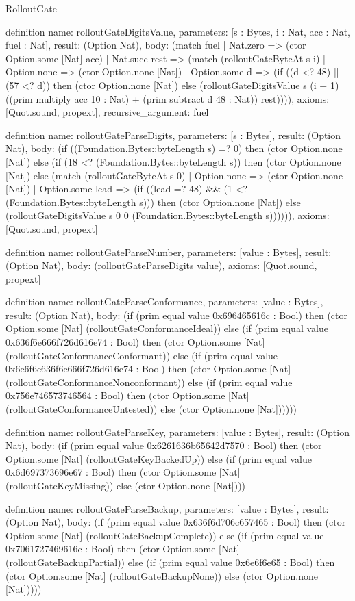 \begin{lexlean}{RolloutGate}
\begin{semanticmodule}
definition{
  name: rolloutGateDigitsValue,
  parameters: [s : Bytes, i : Nat, acc : Nat, fuel : Nat],
  result: (Option Nat),
  body: (match fuel
    | Nat.zero => (ctor Option.some [Nat] acc)
    | Nat.succ rest => (match (rolloutGateByteAt s i)
      | Option.none => (ctor Option.none [Nat])
      | Option.some d => (if ((d <? 48) || (57 <? d)) then (ctor Option.none [Nat]) else (rolloutGateDigitsValue s (i + 1) ((prim multiply acc 10 : Nat) + (prim subtract d 48 : Nat)) rest)))),
  axioms: [Quot.sound, propext],
  recursive_argument: fuel
}

definition{
  name: rolloutGateParseDigits,
  parameters: [s : Bytes],
  result: (Option Nat),
  body: (if ((Foundation.Bytes::byteLength s) =? 0) then (ctor Option.none [Nat]) else (if (18 <? (Foundation.Bytes::byteLength s)) then (ctor Option.none [Nat]) else (match (rolloutGateByteAt s 0)
    | Option.none => (ctor Option.none [Nat])
    | Option.some lead => (if ((lead =? 48) && (1 <? (Foundation.Bytes::byteLength s))) then (ctor Option.none [Nat]) else (rolloutGateDigitsValue s 0 0 (Foundation.Bytes::byteLength s)))))),
  axioms: [Quot.sound, propext]
}

definition{
  name: rolloutGateParseNumber,
  parameters: [value : Bytes],
  result: (Option Nat),
  body: (rolloutGateParseDigits value),
  axioms: [Quot.sound, propext]
}

definition{
  name: rolloutGateParseConformance,
  parameters: [value : Bytes],
  result: (Option Nat),
  body: (if (prim equal value 0x696465616c : Bool) then (ctor Option.some [Nat] (rolloutGateConformanceIdeal)) else (if (prim equal value 0x636f6e666f726d616e74 : Bool) then (ctor Option.some [Nat] (rolloutGateConformanceConformant)) else (if (prim equal value 0x6e6f6e636f6e666f726d616e74 : Bool) then (ctor Option.some [Nat] (rolloutGateConformanceNonconformant)) else (if (prim equal value 0x756e746573746564 : Bool) then (ctor Option.some [Nat] (rolloutGateConformanceUntested)) else (ctor Option.none [Nat])))))
}

definition{
  name: rolloutGateParseKey,
  parameters: [value : Bytes],
  result: (Option Nat),
  body: (if (prim equal value 0x6261636b65642d7570 : Bool) then (ctor Option.some [Nat] (rolloutGateKeyBackedUp)) else (if (prim equal value 0x6d697373696e67 : Bool) then (ctor Option.some [Nat] (rolloutGateKeyMissing)) else (ctor Option.none [Nat])))
}

definition{
  name: rolloutGateParseBackup,
  parameters: [value : Bytes],
  result: (Option Nat),
  body: (if (prim equal value 0x636f6d706c657465 : Bool) then (ctor Option.some [Nat] (rolloutGateBackupComplete)) else (if (prim equal value 0x7061727469616c : Bool) then (ctor Option.some [Nat] (rolloutGateBackupPartial)) else (if (prim equal value 0x6e6f6e65 : Bool) then (ctor Option.some [Nat] (rolloutGateBackupNone)) else (ctor Option.none [Nat]))))
}


\end{semanticmodule}
\end{lexlean}
